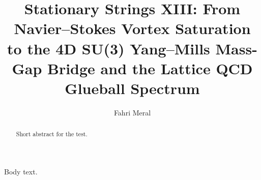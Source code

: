 \documentclass[reprint,aps,pre,twocolumn,notitlepage]{revtex4-2}
\title{Stationary Strings XIII: From Navier--Stokes Vortex Saturation to the 4D SU(3) Yang--Mills Mass-Gap Bridge and the Lattice QCD Glueball Spectrum}
\author{Fahri Meral}
\begin{document}
\begin{abstract}
Short abstract for the test.
\end{abstract}
\maketitle
Body text.


\end{document}
